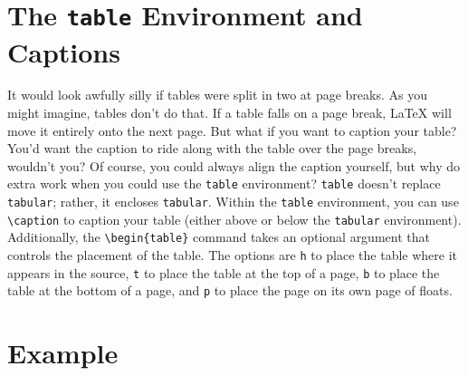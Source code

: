 \section{The \texttt{table} Environment and Captions}
\label{sec:table-envir-capt}

It would look awfully silly if tables were split in two at page
breaks.  As you might imagine, tables don't do that.  If a table falls
on a page break, \LaTeX{} will move it entirely onto the next page.
But what if you want to caption your table?  You'd want the caption to
ride along with the table over the page breaks, wouldn't you?  Of
course, you could always align the caption yourself, but why do extra
work when you could use the \texttt{table} environment?
\texttt{table} doesn't replace \texttt{tabular}; rather, it encloses
\texttt{tabular}.  Within the \texttt{table} environment, you can use
\verb|\caption| to caption your table (either above or below the
\texttt{tabular} environment).  Additionally, the \verb|\begin{table}|
command takes an optional argument that controls the placement of the
table.  The options are \texttt{h} to place the table where it appears
in the source, \texttt{t} to place the table at the top of a page,
\texttt{b} to place the table at the bottom of a page, and \texttt{p}
to place the page on its own page of floats.

\section{Example}
\label{sec:example}

